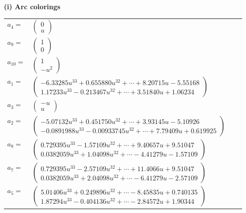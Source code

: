 \documentclass[1p]{elsarticle_modified}
\theoremstyle{definition}
\begin{document}
\flushleft \textbf{(i) Arc colorings}\\
\begin{tabular}{m{7pt} m{180pt} m{7pt} m{180pt} }
\flushright $a_{4}=$&$\begin{pmatrix}0\\u\end{pmatrix}$ \\
\flushright $a_{9}=$&$\begin{pmatrix}1\\0\end{pmatrix}$ \\
\flushright $a_{10}=$&$\begin{pmatrix}1\\- u^2\end{pmatrix}$ \\
\flushright $a_{1}=$&$\begin{pmatrix}-6.33285 u^{33}+0.655880 u^{32}+\cdots+8.20715 u-5.55168\\1.17233 u^{33}-0.213467 u^{32}+\cdots+3.51840 u+1.06234\end{pmatrix}$ \\
\flushright $a_{3}=$&$\begin{pmatrix}- u\\u\end{pmatrix}$ \\
\flushright $a_{2}=$&$\begin{pmatrix}-5.07132 u^{33}+0.451750 u^{32}+\cdots+3.93145 u-5.10926\\-0.0891988 u^{33}-0.00933745 u^{32}+\cdots+7.79409 u+0.619925\end{pmatrix}$ \\
\flushright $a_{8}=$&$\begin{pmatrix}0.729395 u^{33}-1.57109 u^{32}+\cdots+9.40657 u+9.51047\\0.0382059 u^{33}+1.04098 u^{32}+\cdots-4.41279 u-1.57109\end{pmatrix}$ \\
\flushright $a_{7}=$&$\begin{pmatrix}0.729395 u^{33}-2.57109 u^{32}+\cdots+11.4066 u+9.51047\\0.0382059 u^{33}+2.04098 u^{32}+\cdots-6.41279 u-2.57109\end{pmatrix}$ \\
\flushright $a_{5}=$&$\begin{pmatrix}5.01406 u^{33}+0.249896 u^{32}+\cdots-8.45835 u+0.740135\\1.87294 u^{33}-0.404136 u^{32}+\cdots-2.84572 u+1.90344\end{pmatrix}$ \\

\end{tabular}
\end{document}
